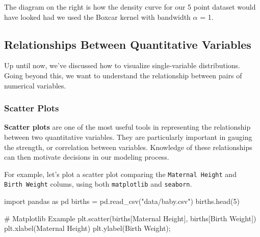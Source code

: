\documentclass[
  letterpaper,
  DIV=11,
  numbers=noendperiod]{scrreprt}
\newenvironment{Shaded}{\begin{snugshade}}{\end{snugshade}}
\newcommand{\CommentTok}[1]{\textcolor[rgb]{0.37,0.37,0.37}{#1}}
\newcommand{\DecValTok}[1]{\textcolor[rgb]{0.68,0.00,0.00}{#1}}
\newcommand{\ImportTok}[1]{\textcolor[rgb]{0.00,0.46,0.62}{#1}}
\newcommand{\NormalTok}[1]{\textcolor[rgb]{0.00,0.23,0.31}{#1}}
\newcommand{\OperatorTok}[1]{\textcolor[rgb]{0.37,0.37,0.37}{#1}}
\newcommand{\StringTok}[1]{\textcolor[rgb]{0.13,0.47,0.30}{#1}}
\begin{document}
The diagram on the right is how the density curve for our 5 point
dataset would have looked had we used the Boxcar kernel with bandwidth
\(\alpha\) = 1.

\hypertarget{relationships-between-quantitative-variables}{%
\subsection{Relationships Between Quantitative
Variables}\label{relationships-between-quantitative-variables}}

Up until now, we've discussed how to visualize single-variable
distributions. Going beyond this, we want to understand the relationship
between pairs of numerical variables.

\hypertarget{scatter-plots}{%
\subsubsection{Scatter Plots}\label{scatter-plots}}

\textbf{Scatter plots} are one of the most useful tools in representing
the relationship between two quantitative variables. They are
particularly important in gauging the strength, or correlation between
variables. Knowledge of these relationships can then motivate decisions
in our modeling process.

For example, let's plot a scatter plot comparing the
\texttt{Maternal\ Height} and \texttt{Birth\ Weight} colums, using both
\texttt{matplotlib} and \texttt{seaborn}.

\begin{Shaded}
\begin{Highlighting}[]
\ImportTok{import}\NormalTok{ pandas }\ImportTok{as}\NormalTok{ pd}
\NormalTok{births }\OperatorTok{=}\NormalTok{ pd.read\_csv(}\StringTok{"data/baby.csv"}\NormalTok{)}
\NormalTok{births.head(}\DecValTok{5}\NormalTok{)}

\CommentTok{\# Matplotlib Example}
\NormalTok{plt.scatter(births[}\StringTok{\textquotesingle{}Maternal Height\textquotesingle{}}\NormalTok{], births[}\StringTok{\textquotesingle{}Birth Weight\textquotesingle{}}\NormalTok{])}
\NormalTok{plt.xlabel(}\StringTok{\textquotesingle{}Maternal Height\textquotesingle{}}\NormalTok{)}
\NormalTok{plt.ylabel(}\StringTok{\textquotesingle{}Birth Weight\textquotesingle{}}\NormalTok{)}\OperatorTok{;}
\end{Highlighting}
\end{Shaded}
\end{document}
